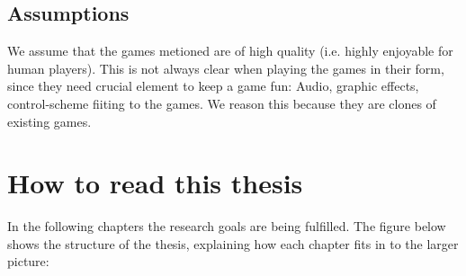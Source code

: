 \documentclass[a4paper,titlepage,final, twoside]{report}
\begin{document}
\subsection{Assumptions}
We assume that the games metioned are of high quality (i.e. highly enjoyable for human players). This is not always clear when playing the games in their form, since they need crucial element to keep a game fun: Audio, graphic effects, control-scheme fiiting to the games.
We reason this because they are clones of existing games.


\section{How to read this thesis}
In the following chapters the research goals are being fulfilled. 
The figure below shows the structure of the thesis, explaining how each chapter fits in to the larger picture:
\end{document}
